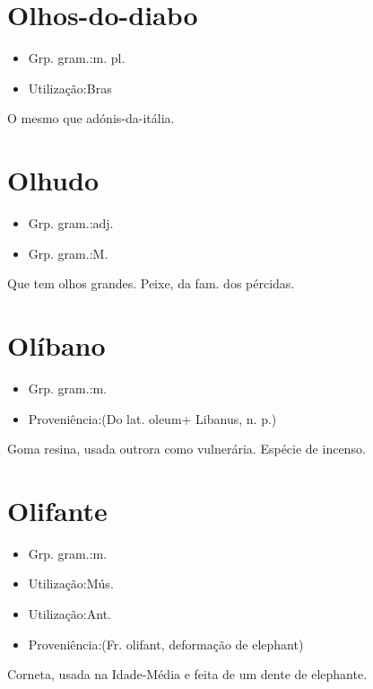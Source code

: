 \section{Olhos-do-diabo}
\begin{itemize}
\item {Grp. gram.:m. pl.}
\end{itemize}
\begin{itemize}
\item {Utilização:Bras}
\end{itemize}
O mesmo que \textunderscore adónis-da-itália\textunderscore .
\section{Olhudo}
\begin{itemize}
\item {Grp. gram.:adj.}
\end{itemize}
\begin{itemize}
\item {Grp. gram.:M.}
\end{itemize}
Que tem olhos grandes.
Peixe, da fam. dos pércidas.
\section{Olíbano}
\begin{itemize}
\item {Grp. gram.:m.}
\end{itemize}
\begin{itemize}
\item {Proveniência:(Do lat. \textunderscore oleum\textunderscore  + \textunderscore Libanus\textunderscore , n. p.)}
\end{itemize}
Goma resina, usada outrora como vulnerária.
Espécie de incenso.
\section{Olifante}
\begin{itemize}
\item {Grp. gram.:m.}
\end{itemize}
\begin{itemize}
\item {Utilização:Mús.}
\end{itemize}
\begin{itemize}
\item {Utilização:Ant.}
\end{itemize}
\begin{itemize}
\item {Proveniência:(Fr. \textunderscore olifant\textunderscore , deformação de \textunderscore elephant\textunderscore )}
\end{itemize}
Corneta, usada na Idade-Média e feita de um dente de elephante.
